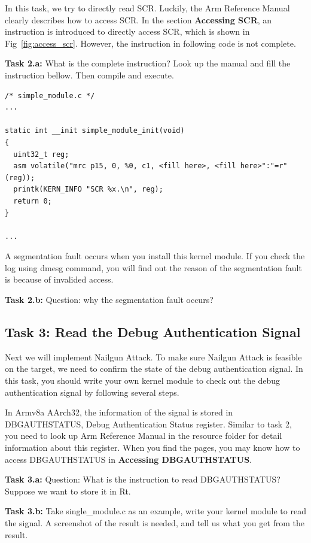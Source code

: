 In this task, we try to directly read SCR. Luckily, the Arm Reference Manual clearly describes how to access SCR. In the section \textbf{Accessing SCR}, an instruction is introduced to directly access SCR, which is shown in Fig~\ref{fig:access_scr}. However, the instruction in following code is not complete.

\textbf{Task 2.a:} What is the complete instruction? Look up the manual and fill the instruction bellow. Then compile and execute.

\begin{lstlisting}
/* simple_module.c */
...

static int __init simple_module_init(void)
{
  uint32_t reg;
  asm volatile("mrc p15, 0, %0, c1, <fill here>, <fill here>":"=r"(reg));
  printk(KERN_INFO "SCR %x.\n", reg);
  return 0;
}

...
\end{lstlisting}

A segmentation fault occurs when you install this kernel module. If you check the log using dmesg command, you will find out the reason of the segmentation fault is because of invalided access. 

\textbf{Task 2.b:} Question: why the segmentation fault occurs?

\subsection{Task 3: Read the Debug Authentication Signal}

Next we will implement Nailgun Attack. To make sure Nailgun Attack is feasible on the target, we need to confirm the state of the debug authentication signal. In this task, you should write your own kernel module to check out the debug authentication signal by following several steps.

In Armv8a AArch32, the information of the signal is stored in DBGAUTHSTATUS, Debug Authentication Status register. Similar to task 2, you need to look up Arm Reference Manual in the resource folder for detail information about this register. When you find the pages, you may know how to access DBGAUTHSTATUS in \textbf{Accessing DBGAUTHSTATUS}.

\textbf{Task 3.a:} Question: What is the instruction to read DBGAUTHSTATUS? Suppose we want to store it in Rt.

\textbf{Task 3.b:} Take single\_module.c as an example, write your kernel module to read the signal. A screenshot of the result is needed, and tell us what you get from the result.

